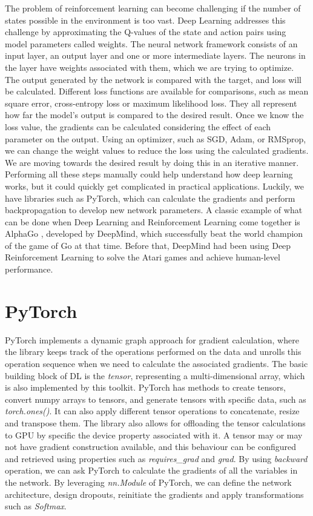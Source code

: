 \documentclass[logo,msc]{infthesis}           %
\begin{document}
The problem of reinforcement learning can become challenging if the number of states possible in the environment is too vast. Deep Learning addresses this challenge by approximating the Q-values of the state and action pairs using model parameters called weights\cite{DBLP:journals/corr/MnihKSGAWR13}. The neural network framework consists of an input layer, an output layer and one or more intermediate layers. The neurons in the layer have weights associated with them, which we are trying to optimize. The output generated by the network is compared with the target, and loss will be calculated. Different loss functions are available for comparisons, such as mean square error, cross-entropy loss or maximum likelihood loss. They all represent how far the model's output is compared to the desired result. Once we know the loss value, the gradients can be calculated considering the effect of each parameter on the output. Using an optimizer, such as SGD, Adam, or RMSprop, we can change the weight values to reduce the loss using the calculated gradients. We are moving towards the desired result by doing this in an iterative manner. Performing all these steps manually could help understand how deep learning works, but it could quickly get complicated in practical applications. Luckily, we have libraries such as PyTorch, which can calculate the gradients and perform backpropagation\cite{backpropagation} to develop new network parameters. A classic example of what can be done when Deep Learning and Reinforcement Learning come together is AlphaGo \cite{AlphaGo}, developed by DeepMind, which successfully beat the world champion of the game of Go at that time. Before that, DeepMind had been using Deep Reinforcement Learning to solve the Atari games and achieve human-level performance\cite {DeepMind}.

\section{PyTorch}

PyTorch implements a dynamic graph approach for gradient calculation, where the library keeps track of the operations performed on the data and unrolls this operation sequence when we need to calculate the associated gradients. The basic building block of DL is the \textit{tensor}, representing a multi-dimensional array, which is also implemented by this toolkit. PyTorch has methods to create tensors, convert numpy arrays to tensors, and generate tensors with specific data, such as \textit{torch.ones()}. It can also apply different tensor operations to concatenate, resize and transpose them. The library also allows for offloading the tensor calculations to GPU by specific the \textit{}device property associated with it. A tensor may or may not have gradient construction available, and this behaviour can be configured and retrieved using properties such as \textit{requires\_grad} and \textit{grad}. By using \textit{backward} operation, we can ask PyTorch to calculate the gradients of all the variables in the network. By leveraging \textit{nn.Module} of PyTorch, we can define the network architecture, design dropouts, reinitiate the gradients and apply transformations such as \textit{Softmax}.
\end{document}
